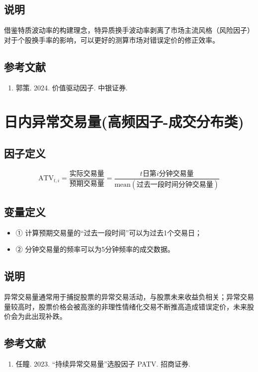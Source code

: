 \documentclass{article}
\begin{document}
\subsection{说明}
借鉴特质波动率的构建理念，特异质换手波动率剥离了市场主流风格（风险因子）对于个股换手率的影响，可以更好的测算市场对错误定价的修正效率。

\subsection{参考文献}
\begin{enumerate}
    \item 郭策. 2024. 价值驱动因子. 中银证券.
\end{enumerate}

\section{日内异常交易量(高频因子-成交分布类)}

\subsection{因子定义}
\begin{equation}
    \mathrm{ATV}_{t,i} = \frac{\text{实际交易量}}{\text{预期交易量}} = \frac{t \text{日第} i \text{分钟交易量}}{\mathrm{mean}(\text{过去一段时间分钟交易量})}
\end{equation}


\subsection{变量定义}
\begin{itemize}
    \item ① 计算预期交易量的“过去一段时间”可以为过去1个交易日；
    \item ② 分钟交易量的频率可以为5分钟频率的成交数据。
\end{itemize}

\subsection{说明}
异常交易量通常用于捕捉股票的异常交易活动，与股票未来收益负相关；异常交易量较高时，股票价格会被高涨的非理性情绪化交易不断推高造成错误定价，未来股价会为此出现补跌。

\subsection{参考文献}
\begin{enumerate}
    \item 任瞳. 2023. “持续异常交易量”选股因子 PATV. 招商证券.
\end{enumerate}
\end{document}
